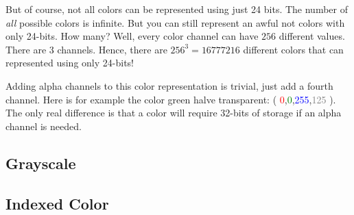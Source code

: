\begin{refsection}
  But of course, not all colors can be represented using just
  24 bits. The number of \textit{all} possible colors is infinite. But you can still
  represent an awful not colors with only 24-bits. How many? Well, every
  color channel can have $256$ different values. There are $3$
  channels. Hence, there are $256^3 = 16777216$ different colors that
  can represented using only 24-bits!

  \newcommand{\rgbaquad}[4]{(
    \textcolor{red}{#1},\textcolor{green}{#2},\textcolor{blue}{#3},\textcolor{gray}{#4} )}

  Adding alpha channels to this color representation is trivial, just
  add a fourth channel. Here is for example the color green halve
  transparent: \rgbaquad{0}{0}{255}{125}. The only real difference is
  that a color will require 32-bits of storage if an alpha channel is needed.

  \subsection{Grayscale}
  \label{sec:other-colors-depths}


  \subsection{Indexed Color}
  \label{sec:indexed-color}


  \printbibliography[heading=subbibliography]
\end{refsection}